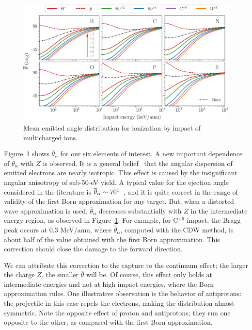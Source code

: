 \documentclass[preprint,12pt]{article}
\begin{document}
\begin{figure}[t!]
\centering
\includegraphics[width=\textwidth]{figuras/ang_mean.eps}
\caption{Mean emitted angle distribution for ionization by impact of
multicharged ions.}
\label{fig:emittedang}
\end{figure} 

Figure~\ref{fig:emittedang} shows $\overline{\theta}_{\alpha}$ for our six elements of 
interest. A new important dependence of $\overline{\theta}_{\alpha}$ 
with $Z$ is observed. It is a general belief~\cite{Rudd1992} that the 
angular dispersion of emitted electrons are nearly isotropic. This effect 
is caused by the insignificant angular anisotropy of sub-50-eV yield. 
A typical value for the ejection angle considered in the literature is 
$\overline{\theta}_{\alpha}\sim 70\degree$~\cite{surdutovic2018}, and 
it is quite correct in the range of validity of the first Born 
approximation for any target. But, when a distorted wave approximation 
is used, $\overline{\theta}_{\alpha}$ decreases substantially with $Z$ 
in the intermediate energy region, as observed in Figure~\ref{fig:emittedang}. 
For example, for C$^{+6}$ impact, the Bragg peak occurs at 0.3 MeV/amu, 
where $\overline{\theta}_{\alpha}$, computed with the CDW method, is 
about half of the value obtained with the first Born approximation. 
This correction should close the damage to the forward direction.

We can attribute this correction to the capture to the continuum effect;
the larger the charge $Z$, the smaller $\overline{\theta}$ will be. Of 
course, this effect only holds at intermediate energies and not at high 
impact energies, where the Born approximation rules. One illustrative 
observation is the behavior of antiprotons: the projectile in this case 
repels the electrons, making the distribution almost symmetric. 
Note the opposite effect of proton and antiprotons; they run one 
opposite to the other, as compared with the first Born approximation.
\end{document}
